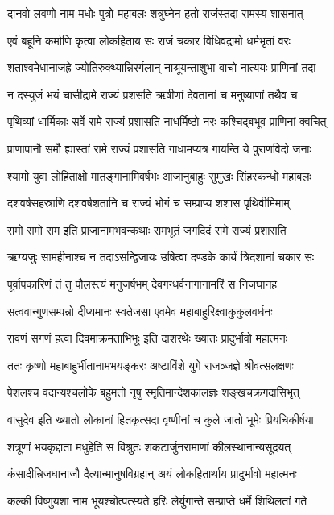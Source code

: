 \twolineshloka
{दानवो लवणो नाम मधोः पुत्रो महाबलः}
{शत्रुघ्नेन हतो राजंस्तदा रामस्य शासनात्}


\twolineshloka
{एवं बहूनि कर्माणि कृत्वा लोकहिताय सः}
{राजं चकार विधिवद्रामो धर्मभृतां वरः}


\threelineshloka
{शताश्वमेधानाजह्रे ज्योतिरुक्थ्यान्निरर्गलान्}
{नाश्रूयन्ताशुभा वाचो नात्ययः प्राणिनां तदा}
{}


\twolineshloka
{न दस्युजं भयं चासीद्रामे राज्यं प्रशसति}
{ऋषीणां देवतानां च मनुष्याणां तथैव च}


\twolineshloka
{पृथिव्यां धार्मिकाः सर्वे रामे राज्यं प्रशासति}
{नाधर्मिष्ठो नरः कश्चिद्बभूव प्राणिनां क्वचित्}


\twolineshloka
{प्राणापानौ समौ ह्यास्तां रामे राज्यं प्रशासति}
{गाधामप्यत्र गायन्ति ये पुराणविदो जनाः}


\twolineshloka
{श्यामो युवा लोहिताक्षो मातङ्गानामिवर्षभः}
{आजानुबाहुः सुमुखः सिंहस्कन्धो महाबलः}


\twolineshloka
{दशवर्षसहस्राणि दशवर्षशतानि च}
{राज्यं भोगं च सम्प्राप्य शशास पृथिवीमिमाम्}


\twolineshloka
{रामो रामो राम इति प्राजानामभवन्कथाः}
{रामभूतं जगदिदं रामे राज्यं प्रशासति}


\twolineshloka
{ऋग्यजुः सामहीनाश्च न तदाऽसन्द्विजायः}
{उषित्वा दण्डके कार्यं त्रिदशानां चकार सः}


\twolineshloka
{पूर्वापकारिणं तं तु पौलस्त्यं मनुजर्षभम्}
{देवगन्धर्वनागानामरिं स निजघानह}


\twolineshloka
{सत्ववान्गुणसम्पन्नो दीप्यमानः स्वतेजसा}
{एवमेव महाबाहुरिक्ष्वाकुकुलवर्धनः}


\twolineshloka
{रावणं सगणं हत्वा दिवमाक्रमताभिभूः}
{इति दाशरथेः ख्यातः प्रादुर्भावो महात्मनः}


\twolineshloka
{ततः कृष्णो महाबाहुर्भीतानामभयङ्करः}
{अष्टाविंशे युगे राजञ्जज्ञे श्रीवत्सलक्षणः}


\twolineshloka
{पेशलश्च वदान्यश्चलोके बहुमतो नृषु}
{स्मृतिमान्देशकालज्ञः शङ्खचक्रगदासिभृत्}


\twolineshloka
{वासुदेव इति ख्यातो लोकानां हितकृत्सदा}
{वृष्णीनां च कुले जातो भूमेः प्रियचिकीर्षया}


\twolineshloka
{शत्रूणां भयकृद्दाता मधुहेति स विश्रुतः}
{शकटार्जुनरामाणां कीलस्थानान्यसूदयत्}


\twolineshloka
{कंसादीन्निजघानाजौ दैत्यान्मानुषविग्रहान्}
{अयं लोकहितार्थाय प्रादुर्भावो महात्मनः}


\twolineshloka
{कल्की विष्णुयशा नाम भूयश्चोत्पत्स्यते हरिः}
{लेर्युगान्ते सम्प्राप्ते धर्मे शिथिलतां गते}



